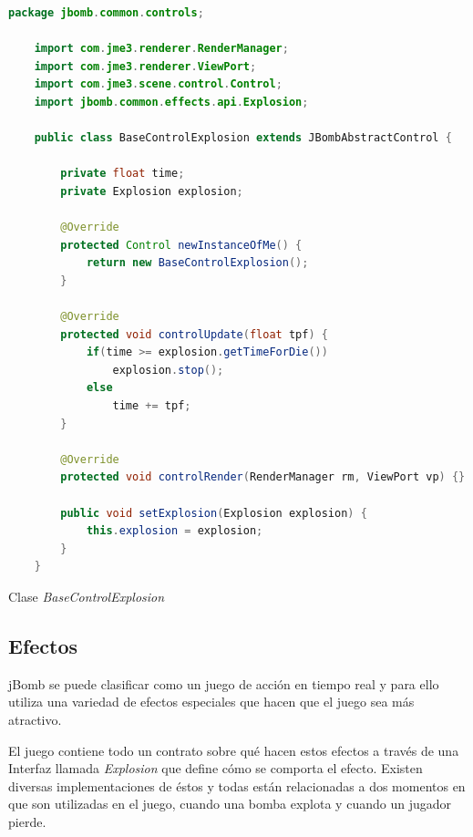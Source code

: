\documentclass[a4paper,12pt,openany,oneside]{book}
\begin{document}
\begin{codigo}
\begin{lstlisting}[language=Java,frame=single,basicstyle=\scriptsize]
	package jbomb.common.controls;
	
	import com.jme3.renderer.RenderManager;
	import com.jme3.renderer.ViewPort;
	import com.jme3.scene.control.Control;
	import jbomb.common.effects.api.Explosion;
	
	public class BaseControlExplosion extends JBombAbstractControl {
	    
	    private float time;
	    private Explosion explosion;
	
	    @Override
	    protected Control newInstanceOfMe() {
	        return new BaseControlExplosion();
	    }
	
	    @Override
	    protected void controlUpdate(float tpf) {
	        if(time >= explosion.getTimeForDie())
	            explosion.stop();
	        else
	            time += tpf;
	    }
	
	    @Override
	    protected void controlRender(RenderManager rm, ViewPort vp) {}
	    
	    public void setExplosion(Explosion explosion) {
	        this.explosion = explosion;
	    }
	}
\end{lstlisting}
\caption{Clase \textit{BaseControlExplosion}}
\label{lst6}
\end{codigo}
\subsection{Efectos}
jBomb se puede clasificar como un juego de acción en tiempo real y para ello utiliza una variedad de efectos especiales que hacen que el juego sea más atractivo.

El juego contiene todo un contrato sobre qué hacen estos efectos a través de una Interfaz llamada \textit{Explosion} que define cómo se comporta el efecto. Existen diversas implementaciones de éstos y todas están relacionadas a dos momentos en que son utilizadas en el juego, cuando una bomba explota y cuando un jugador pierde.
\end{document}
